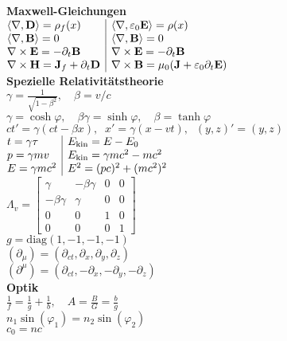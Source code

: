 \documentclass[a4paper,10pt,fleqn,twoside,twocolumn,dvipdfmx]{scrartcl}
\newcommand{\strong}[1]{\textsf{\textbf{#1}}}
\newcommand{\ds}{\displaystyle}
\newcommand{\bvec}[1]{\mathbf{#1}}
\begin{document}
\newpage

\noindent
\strong{Maxwell-Gleichungen}\\
$\begin{array}{@{}l|l}
\langle\nabla,\bvec D\rangle = \rho_f(x)
& \langle\nabla,\varepsilon_0\bvec E\rangle = \rho(x)
\\
\langle\nabla,\bvec B\rangle = 0
& \langle\nabla,\bvec B\rangle = 0\\
\nabla\times\bvec E = -\partial_t\bvec B
& \nabla\times\bvec E = -\partial_t\bvec B\\
\nabla\times\bvec H = \bvec J_f+\partial_t\bvec D
& \nabla\times\bvec B = \mu_0 (\bvec J+\varepsilon_0\partial_t \bvec E)
\end{array}$\\[4pt]
\strong{Spezielle Relativitätstheorie}\\
$\ds \gamma = \frac{1}{\sqrt{1-\beta^2}},\quad\beta=v/c$\\
$\gamma = \cosh\varphi,\quad
\beta\gamma = \sinh\varphi,\quad
\beta = \tanh\varphi$\\
$ct'=\gamma(ct-\beta x),\;\; x'=\gamma(x-vt),
\;\; (y,z)'=(y,z)$\\
$\begin{array}{@{}l|l}
t = \gamma\tau & E_\mathrm{kin} = E-E_0\\
p = \gamma mv & E_\mathrm{kin} = \gamma mc^2-mc^2\\
E = \gamma mc^2 & E^2 = (pc)^2 + (mc^2)^2\\
\end{array}$\\
$\Lambda_v = \begin{bmatrix}
\gamma & -\beta\gamma & 0 & 0\\
-\beta\gamma & \gamma & 0 & 0\\
0 & 0 & 1 & 0\\
0 & 0 & 0 & 1
\end{bmatrix}$\\
$g=\mathrm{diag}(1,-1,-1,-1)$\\
$(\partial_\mu) = (\partial_{ct},\partial_x,\partial_y,\partial_z)$\\
$(\partial^\mu) = (\partial_{ct},-\partial_x,-\partial_y,-\partial_z)$\\[4pt]
\strong{Optik}\\
$\ds\frac{1}{f}=\frac{1}{g}+\frac{1}{b},\quad
A = \frac{B}{G} = \frac{b}{g}$\\
$n_1\sin(\varphi_1) = n_2\sin(\varphi_2)$\\
$c_0 = nc$\\[4pt]
\end{document}
